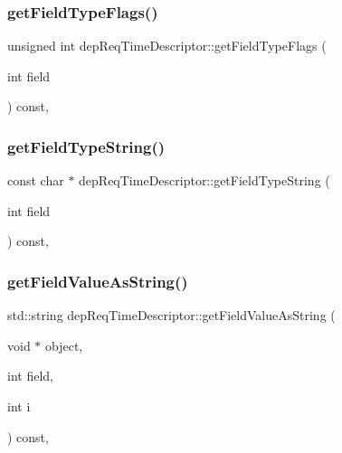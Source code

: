 \subsubsection{\texorpdfstring{get\+Field\+Type\+Flags()}{getFieldTypeFlags()}}
{\footnotesize\ttfamily unsigned int dep\+Req\+Time\+Descriptor\+::get\+Field\+Type\+Flags (\begin{DoxyParamCaption}\item[{int}]{field }\end{DoxyParamCaption}) const\hspace{0.3cm}{\ttfamily [override]}, {\ttfamily [virtual]}}

\mbox{\label{classdep_req_time_descriptor_af28f6a1029b87177e101167d3fc89c3b}} 
\subsubsection{\texorpdfstring{get\+Field\+Type\+String()}{getFieldTypeString()}}
{\footnotesize\ttfamily const char $\ast$ dep\+Req\+Time\+Descriptor\+::get\+Field\+Type\+String (\begin{DoxyParamCaption}\item[{int}]{field }\end{DoxyParamCaption}) const\hspace{0.3cm}{\ttfamily [override]}, {\ttfamily [virtual]}}

\mbox{\label{classdep_req_time_descriptor_a93ae2e8b0dece6757eabe758959988fd}} 
\subsubsection{\texorpdfstring{get\+Field\+Value\+As\+String()}{getFieldValueAsString()}}
{\footnotesize\ttfamily std\+::string dep\+Req\+Time\+Descriptor\+::get\+Field\+Value\+As\+String (\begin{DoxyParamCaption}\item[{void $\ast$}]{object,  }\item[{int}]{field,  }\item[{int}]{i }\end{DoxyParamCaption}) const\hspace{0.3cm}{\ttfamily [override]}, {\ttfamily [virtual]}}

